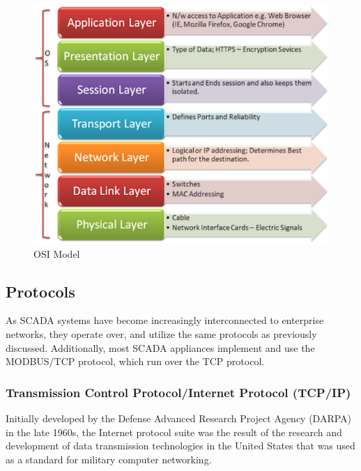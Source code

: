 \documentclass[12pt,]{article}
\begin{document}
\begin{figure}

{\centering \includegraphics{thesis_files/figure-latex/unnamed-chunk-6-1} 

}

\caption{OSI Model}\label{fig:unnamed-chunk-6}
\end{figure}

\subsection{Protocols}\label{protocols}

As SCADA systems have become increasingly interconnected to enterprise
networks, they operate over, and utilize the same protocols as
previously discussed. Additionally, most SCADA appliances implement and
use the MODBUS/TCP protocol, which run over the TCP protocol.

\subsubsection{Transmission Control Protocol/Internet Protocol
(TCP/IP)}\label{transmission-control-protocolinternet-protocol-tcpip}

Initially developed by the Defense Advanced Research Project Agency
(DARPA) in the late 1960s, the Internet protocol suite was the result of
the research and development of data transmission technologies in the
United States that was used as a standard for military computer
networking.
\end{document}
